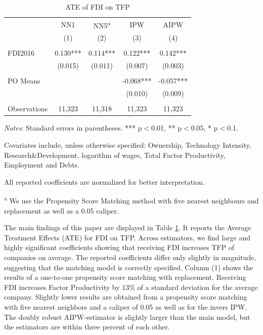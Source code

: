 \documentclass[a4paper,11pt]{scrartcl}
\begin{document}
\begin{table}[h]
 	\centering
   	\caption{ATE of FDI on TFP}
   	\label{tab:mainresults}
\begin{threeparttable}

\begin{tabular}{lcccc} 
	\hline
	\hline
 			& NN1 & NN5\textsuperscript{a} & IPW & AIPW \\
 			& (1) & (2) & (3)  & (4) \\ \hline
 			&  &  &  &    \\
FDI2016 	& 0.130*** & 0.114*** & 0.122***  & 0.142***   \\
 			& (0.015) & (0.011) & (0.007) &   (0.003)  \\
 	&  &  &  &    \\
PO Means 	& & & -0.068*** &  -0.057*** \\
			&  &  & (0.010)  &  (0.009) \\
			&  &  &  &    \\
 Observations & 11,323 & 11,318 & 11,323 & 11,323 \\ 
 	\hline
 	\hline
\end{tabular}

\begin{tablenotes}[flushleft]
      \footnotesize
\item \textit{Notes}: Standard errors in parentheses. *** p$<$0.01, ** p$<$0.05, * p$<$0.1.
\item Covariates include, unless otherwise specified: Ownership, Technology Intensity, Research\&Development, logarithm of wages, Total Factor Productivity, Employment and Debts. 
\item All reported coefficients are normalized for better interpretation. %
\item\textsuperscript{a} We use the Propensity Score Matching method with five nearest neighbours and replacement as well as a 0.05 caliper. 
\end{tablenotes}

\end{threeparttable}
\end{table}

The main findings of this paper are displayed in Table \ref{tab:mainresults}. It reports the Average Treatment Effects (ATE) for FDI on TFP. Across estimators, we find large and highly significant coefficients showing that receiving FDI increases TFP of companies on average. The reported coefficients differ only slightly in magnitude, suggesting that the matching model is correctly specified.  Column (1) shows the results of a one-to-one propensity score matching with replacement. Receiving FDI  increases Factor Productivity by 13\% of a standard deviation for the average company. Slightly lower results are obtained from a propensity score matching with five nearest neighbors and a caliper of 0.05 as well as for the invers IPW. The doubly robust AIPW-estimator is slightly larger than the main model, but the estimators are within three percent of each other.
\end{document}
